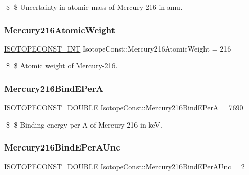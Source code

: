\$ \$ Uncertainty in atomic mass of Mercury-\/216 in amu. \mbox{\label{group___isotope_const-_mercury-_hg216_gadc575d2984773bc4e0461b7fd59019aa}} 
\subsubsection{\texorpdfstring{Mercury216\+Atomic\+Weight}{Mercury216AtomicWeight}}
{\footnotesize\ttfamily \mbox{\hyperlink{group___isotope_const-_macros_ga5f18360b3e99483a35c32d789e62621c}{I\+S\+O\+T\+O\+P\+E\+C\+O\+N\+S\+T\+\_\+\+I\+NT}} Isotope\+Const\+::\+Mercury216\+Atomic\+Weight = 216}

\$ \$ Atomic weight of Mercury-\/216. \mbox{\label{group___isotope_const-_mercury-_hg216_gac78a547b6cf01c55464b23e770280ac4}} 
\subsubsection{\texorpdfstring{Mercury216\+Bind\+E\+PerA}{Mercury216BindEPerA}}
{\footnotesize\ttfamily \mbox{\hyperlink{group___isotope_const-_macros_ga8f45a7272ce02c0b4c65c44636ed719a}{I\+S\+O\+T\+O\+P\+E\+C\+O\+N\+S\+T\+\_\+\+D\+O\+U\+B\+LE}} Isotope\+Const\+::\+Mercury216\+Bind\+E\+PerA = 7690}

\$ \$ Binding energy per A of Mercury-\/216 in keV. \mbox{\label{group___isotope_const-_mercury-_hg216_gac63c207442b63f5a7923c484496dd302}} 
\subsubsection{\texorpdfstring{Mercury216\+Bind\+E\+Per\+A\+Unc}{Mercury216BindEPerAUnc}}
{\footnotesize\ttfamily \mbox{\hyperlink{group___isotope_const-_macros_ga8f45a7272ce02c0b4c65c44636ed719a}{I\+S\+O\+T\+O\+P\+E\+C\+O\+N\+S\+T\+\_\+\+D\+O\+U\+B\+LE}} Isotope\+Const\+::\+Mercury216\+Bind\+E\+Per\+A\+Unc = 2}

